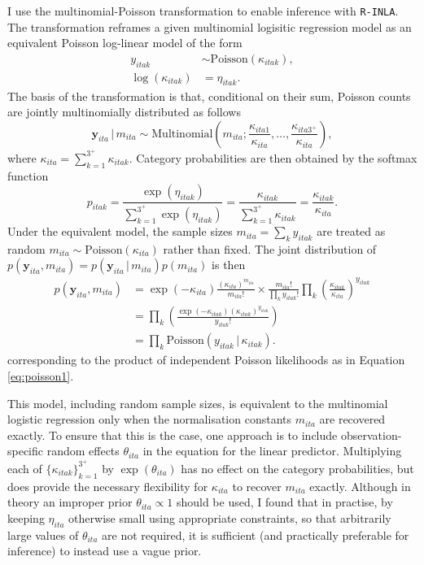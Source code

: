 \documentclass[a4paper, nobind]{templates/ociamthesis}
\begin{document}
I use the multinomial-Poisson transformation to enable inference with \texttt{R-INLA}.
The transformation reframes a given multinomial logisitic regression model as an equivalent Poisson log-linear model of the form
\begin{align}
    y_{itak} &\sim \text{Poisson}(\kappa_{itak}), \label{eq:poisson1} \\
    \log(\kappa_{itak}) &= \eta_{itak}. \label{eq:poisson2}
\end{align}
The basis of the transformation is that, conditional on their sum, Poisson counts are jointly multinomially distributed \autocite{mccullagh1989generalized} as follows
\begin{equation}
    \mathbf{y}_{ita} \, | \, m_{ita} \sim \text{Multinomial} \left( m_{ita}; \frac{\kappa_{ita1}}{\kappa_{ita}}, \ldots, \frac{\kappa_{ita3^{+}}}{\kappa_{ita}} \right),
\end{equation}
where \(\kappa_{ita} = \sum_{k = 1}^{3^{+}} \kappa_{itak}\).
Category probabilities are then obtained by the softmax function
\begin{equation}
    p_{itak} = \frac{\exp(\eta_{itak})}{\sum_{k = 1}^{3^{+}} \exp(\eta_{itak})} = \frac{\kappa_{itak}}{\sum_{k = 1}^{3^{+}} \kappa_{itak}} = \frac{\kappa_{itak}}{\kappa_{ita}}.
\end{equation}
Under the equivalent model, the sample sizes \(m_{ita} = \sum_k y_{itak}\) are treated as random \(m_{ita} \sim \text{Poisson} \left( \kappa_{ita} \right)\) rather than fixed.
The joint distribution of \(p(\mathbf{y}_{ita}, m_{ita}) = p(\mathbf{y}_{ita} \, | \, m_{ita})p(m_{ita})\) is then
\begin{align}
p(\mathbf{y}_{ita}, m_{ita}) &= \exp(-\kappa_{ita}) \frac{(\kappa_{ita})^{m_{ita}}}{m_{ita}!} \times \frac{m_{ita}!}{\prod_k y_{itak}!} \prod_k \left( \frac{\kappa_{itak}}{\kappa_{ita}} \right)^{y_{itak}} \\
&= \prod_k \left( \frac{\exp(-\kappa_{itak}) \left( \kappa_{itak} \right)^{y_{itak}}}{y_{itak}!} \right) \\
&= \prod_k \text{Poisson} \left( y_{itak} \, | \, \kappa_{itak} \right). \label{eq:prodpoisson}
\end{align}
corresponding to the product of independent Poisson likelihoods as in Equation \ref{eq:poisson1}.

This model, including random sample sizes, is equivalent to the multinomial logistic regression only when the normalisation constants \(m_{ita}\) are recovered exactly.
To ensure that this is the case, one approach is to include observation-specific random effects \(\theta_{ita}\) in the equation for the linear predictor.
Multiplying each of \(\{\kappa_{itak}\}_{k = 1}^{3^+}\) by \(\exp(\theta_{ita})\) has no effect on the category probabilities, but does provide the necessary flexibility for \(\kappa_{ita}\) to recover \(m_{ita}\) exactly.
Although in theory an improper prior \(\theta_{ita} \propto 1\) should be used, I found that in practise, by keeping \(\eta_{ita}\) otherwise small using appropriate constraints, so that arbitrarily large values of \(\theta_{ita}\) are not required, it is sufficient (and practically preferable for inference) to instead use a vague prior.
\end{document}

